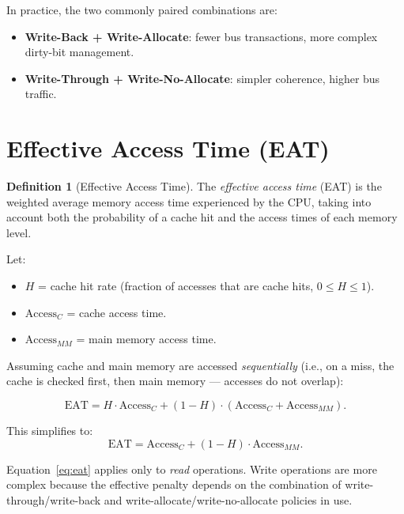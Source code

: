 \documentclass[11pt, a4paper, notitlepage]{report}
\theoremstyle{definition}
\newtheorem{definition}[theorem]{Definition}
\theoremstyle{remark}
\theoremstyle{definition}
\begin{document}
\begin{keyresult}[title={Key Result: Write Policy Combinations}]
  In practice, the two commonly paired combinations are:
  \begin{itemize}
    \item \textbf{Write-Back + Write-Allocate}: fewer bus transactions, more complex dirty-bit management.
    \item \textbf{Write-Through + Write-No-Allocate}: simpler coherence, higher bus traffic.
  \end{itemize}
\end{keyresult}

\section{Effective Access Time (EAT)}
\label{sec:eat}

\begin{definition}[Effective Access Time]
  \label{def:eat}
  The \emph{effective access time} (EAT) is the weighted average memory access time experienced by the CPU, taking into account both the probability of a cache hit and the access times of each memory level.
\end{definition}

Let:
\begin{itemize}
  \item $H$ = cache hit rate (fraction of accesses that are cache hits, $0 \le H \le 1$).
  \item $\text{Access}_C$ = cache access time.
  \item $\text{Access}_{MM}$ = main memory access time.
\end{itemize}

Assuming cache and main memory are accessed \emph{sequentially} (i.e., on a miss, the cache is checked first, then main memory — accesses do not overlap):

\begin{equation}
  \text{EAT} = H \cdot \text{Access}_C + (1-H)\cdot(\text{Access}_C + \text{Access}_{MM}).
  \label{eq:eat}
\end{equation}

This simplifies to:
\[
  \text{EAT} = \text{Access}_C + (1-H)\cdot \text{Access}_{MM}.
\]

\begin{warning}[title={Warning: EAT Formula Applies to READ Only}]
  Equation~\eqref{eq:eat} applies only to \emph{read} operations. Write operations are more complex because the effective penalty depends on the combination of write-through/write-back and write-allocate/write-no-allocate policies in use.
\end{warning}
\end{document}
